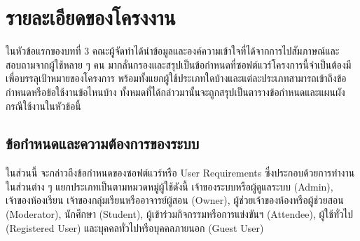 \documentclass[12pt,one side,openright,a4paper]{cpe-thesis-th}
\newcommand{\thaijustify}[1]{%
  \par\hspace{30pt}\justifying
  #1
}
\begin{document}
\section{รายละเอียดของโครงงาน}
    \thaijustify{
        ในหัวข้อแรกของบทที่ 3 คณะผู้จัดทำได้นำข้อมูลและองค์ความเข้าใจที่ได้จากการไปสัมภาษณ์และสอบถามจากผู้ใช้หลาย ๆ คน มากลั่นกรองและสรุปเป็นข้อกำหนดที่ซอฟต์แวร์โครงการนี้จำเป็นต้องมีเพื่อบรรลุเป้าหมายของโครงการ พร้อมทั้งแยกผู้ใช้ประเภทใดบ้างและแต่ละประเภทสามารถเข้าถึงข้อกำหนดหรือข้อใช้งานข้อไหนบ้าง ทั้งหมดที่ได้กล่าวมานั้นจะถูกสรุปเป็นตารางข้อกำหนดและแผนผังกรณีใช้งานในหัวข้อนี้
    }
    \subsection{ข้อกำหนดและความต้องการของระบบ}
        \thaijustify{
            ในส่วนนี้ จะกล่าวถึงข้อกำหนดของซอฟต์แวร์หรือ User Requirements ซึ่งประกอบด้วยการทำงานในส่วนต่าง ๆ แยกประเภทเป็นตามหมวดหมู่ผู้ใช้ดังนี้ เจ้าของระบบหรือผู้ดูแลระบบ (Admin), เจ้าของห้องเรียน เจ้าของกลุ่มเรียนหรืออาจารย์ผู้สอน (Owner), ผู้ช่วยเจ้าของห้องหรือผู้ช่วยสอน (Moderator), นักศึกษา (Student), ผู้เข้าร่วมกิจกรรมหรือการแข่งขันฯ (Attendee), ผู้ใช้ทั่วไป (Registered User) และบุคคลทั่วไปหรือบุคคลภายนอก (Guest User)
        }
\end{document}
